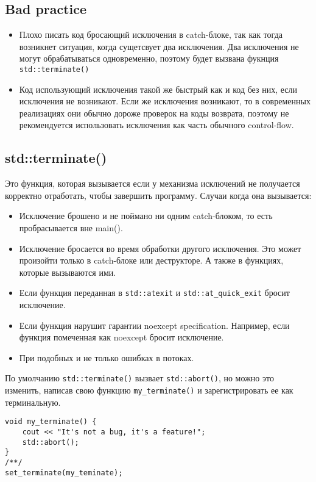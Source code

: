 \subsection{Bad practice}
\begin{itemize}
\item
Плохо писать код бросающий исключения в catch-блоке, так как тогда возникнет ситуация, когда сущетсвует два исключения. Два исключения не могут обрабатываться одновременно, поэтому будет вызвана фукнция \texttt{std::terminate()}
\item
Код использующий исключения такой же быстрый как и код без них, если исключения не возникают. Если же исключения возникают, то в современных реализациях они обычно дороже проверок на коды возврата, поэтому не рекомендуется использовать исключения как часть обычного control-flow.
\end{itemize}

\subsection{std::terminate()}

Это функция, которая вызывается если у механизма исключений не получается корректно отработать, чтобы завершить программу.
Случаи когда она вызывается:
\begin{itemize}
\item Исключение брошено и не поймано ни одним catch-блоком, то есть пробрасывается вне main().
\item Исключение бросается во время обработки другого исключения. Это может произойти только в catch-блоке или деструкторе. А также в функциях, которые вызываются ими. %
\item Если функция переданная в \texttt{std::atexit} и \texttt{std::at_quick_exit} бросит исключение.
\item Если функция нарушит гарантии noexcept specification. Например, если функция помеченная как noexcept бросит исключение.
\item При подобных и не только ошибках в потоках. %
\end{itemize}

По умолчанию \texttt{std::terminate()} вызвает \texttt{std::abort()}, но можно это изменить, написав свою функцию \texttt{my_terminate()} и зарегистрировать ее как терминальную.
\begin{verbatim}
void my_terminate() {
    cout << "It's not a bug, it's a feature!";
    std::abort();
}
/**/
set_terminate(my_teminate);
\end{verbatim}

